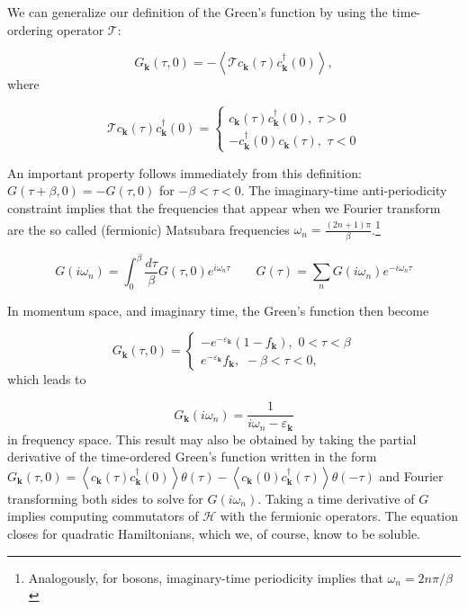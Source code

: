 We can generalize our definition of the Green's function by using the time-ordering operator $\mathcal{T}$:

\begin{equation}
G_{\bm k}(\tau, 0) = - \left\langle \mathcal{T} c_{\bm k} ( \tau) c_{\bm k}^\dagger ( 0 ) \right\rangle ,
\end{equation}
where

\begin{equation}
\mathcal{T} c_{\bm k} ( \tau) c_{\bm k}^\dagger ( 0 ) =
\begin{cases}
c_{\bm k} ( \tau) c_{\bm k}^\dagger ( 0 ), \,\, \tau > 0 \\
- c_{\bm k}^\dagger ( 0 ) c_{\bm k} ( \tau) , \,\, \tau < 0
\end{cases}
\end{equation}

An important property follows immediately from this definition: $G ( \tau + \beta, 0 ) = - G( \tau, 0 )$ for $ -\beta < \tau < 0$.
The imaginary-time anti-periodicity constraint implies that the frequencies that appear when we Fourier transform are the so called (fermionic) Matsubara frequencies $\omega_n = \frac{(2n + 1) \pi}{\beta}$.\footnote{Analogously, for bosons, imaginary-time periodicity implies that $\omega_n = 2n \pi / \beta$}

\begin{equation}
G ( i \omega_n ) = \int_0^\beta \frac{d\tau}{\beta} G( \tau, 0) e^{i\omega_n \tau} \quad\quad G (\tau) = \sum_n G ( i \omega_n ) e^{ - i \omega_n \tau}
\end{equation}

In momentum space, and imaginary time, the Green's function then become

\begin{equation}
G_{\bm k} (\tau, 0 ) =
\begin{cases}
-e^{-\varepsilon_{\bm k}} ( 1 - f_{\bm k} ) , \,\, 0 < \tau < \beta \\
e^{-\varepsilon_{\bm k}} f_{\bm k} , \,\, -\beta < \tau < 0 ,
\end{cases}
\end{equation}
which leads to

\begin{equation}
G_{\bm k} ( i \omega_n ) = \frac{1}{i\omega_n - \varepsilon_{\bm k} }
\end{equation}
in frequency space. This result may also be obtained by taking the partial derivative of the time-ordered Green's function written in the form $
G_{\bm k} ( \tau, 0 ) = \left\langle c_{\bm k} ( \tau) c_{\bm k}^\dagger ( 0 ) \right\rangle \theta ( \tau ) - \left\langle c_{\bm k} ( 0 ) c_{\bm k}^\dagger ( \tau ) \right\rangle \theta ( -\tau )
$
 and Fourier transforming both sides to solve for $G ( i \omega_n )$.
Taking a time derivative of $G$ implies computing commutators of $\mathcal{H}$ with the fermionic operators.
The equation closes for quadratic Hamiltonians, which we, of course, know to be soluble.

